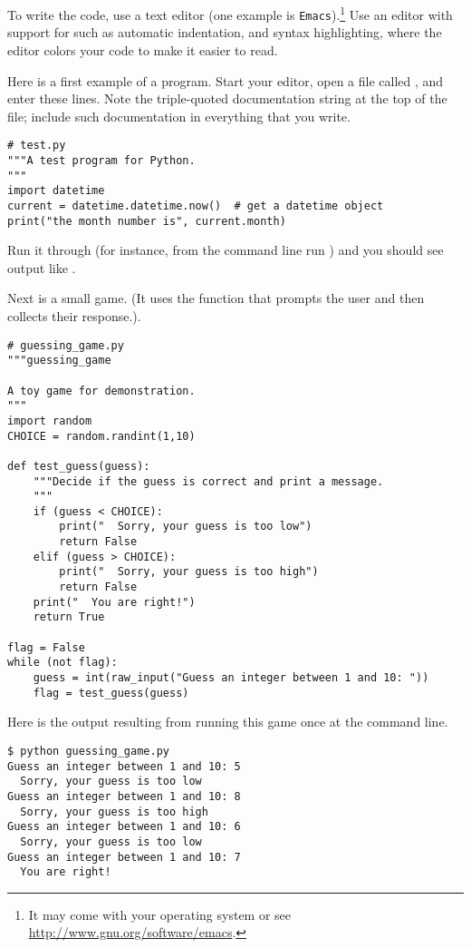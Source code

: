To write the code, use a text editor (one example is 
\texttt{Emacs}).\footnote{It may come with your operating system or 
see \protect\url{http://www.gnu.org/software/emacs}.}
Use an editor with support for \python{} such as
automatic indentation, and  
syntax highlighting, where the editor colors your code to make it easier to
read.

Here is a first example of a \python{} program.
Start your editor, open a file called , and enter these lines.
Note the triple-quoted documentation string at the top of the file; 
include such documentation in everything that you write.
\begin{lstlisting}[style=python]
# test.py
"""A test program for Python. 
"""
import datetime
current = datetime.datetime.now()  # get a datetime object
print("the month number is", current.month)
\end{lstlisting}
Run it through \python{} (for instance, from the command line
run ) and you should see
output like .

Next is a small game. 
(It uses the \python{} function  that prompts the user
and then collects their response.).
\begin{lstlisting}[style=python]
# guessing_game.py
"""guessing_game

A toy game for demonstration.
"""
import random
CHOICE = random.randint(1,10)

def test_guess(guess):
    """Decide if the guess is correct and print a message.
    """
    if (guess < CHOICE):
        print("  Sorry, your guess is too low")
        return False
    elif (guess > CHOICE):
        print("  Sorry, your guess is too high")
        return False
    print("  You are right!")
    return True

flag = False
while (not flag):
    guess = int(raw_input("Guess an integer between 1 and 10: "))
    flag = test_guess(guess)
\end{lstlisting}
Here is the output resulting from running this game once at the command line.
\begin{lstlisting}
$ python guessing_game.py
Guess an integer between 1 and 10: 5
  Sorry, your guess is too low
Guess an integer between 1 and 10: 8
  Sorry, your guess is too high
Guess an integer between 1 and 10: 6
  Sorry, your guess is too low
Guess an integer between 1 and 10: 7
  You are right!
\end{lstlisting}  %

